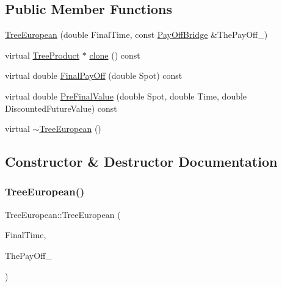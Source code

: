 \subsection*{Public Member Functions}
\begin{DoxyCompactItemize}
\item 
\hyperlink{classTreeEuropean_a5ca3f34084408eb368a713175395d7ec}{Tree\+European} (double Final\+Time, const \hyperlink{classPayOffBridge}{Pay\+Off\+Bridge} \&The\+Pay\+Off\+\_\+)
\item 
virtual \hyperlink{classTreeProduct}{Tree\+Product} $\ast$ \hyperlink{classTreeEuropean_acf540b1c3082da0853905f252bf9d773}{clone} () const
\item 
virtual double \hyperlink{classTreeEuropean_aaffa40394d1021120a87dfa8e176c321}{Final\+Pay\+Off} (double Spot) const
\item 
virtual double \hyperlink{classTreeEuropean_a555787d536320f1d9ce776da1c785058}{Pre\+Final\+Value} (double Spot, double Time, double Discounted\+Future\+Value) const
\item 
virtual \hyperlink{classTreeEuropean_a830d460b0f43515fb8f90720a2197b9e}{$\sim$\+Tree\+European} ()
\end{DoxyCompactItemize}


\subsection{Constructor \& Destructor Documentation}
\hypertarget{classTreeEuropean_a5ca3f34084408eb368a713175395d7ec}{}\label{classTreeEuropean_a5ca3f34084408eb368a713175395d7ec} 
\subsubsection{\texorpdfstring{Tree\+European()}{TreeEuropean()}}
{\footnotesize\ttfamily Tree\+European\+::\+Tree\+European (\begin{DoxyParamCaption}\item[{double}]{Final\+Time,  }\item[{const \hyperlink{classPayOffBridge}{Pay\+Off\+Bridge} \&}]{The\+Pay\+Off\+\_\+ }\end{DoxyParamCaption})}

\hypertarget{classTreeEuropean_a830d460b0f43515fb8f90720a2197b9e}{}\label{classTreeEuropean_a830d460b0f43515fb8f90720a2197b9e} 
